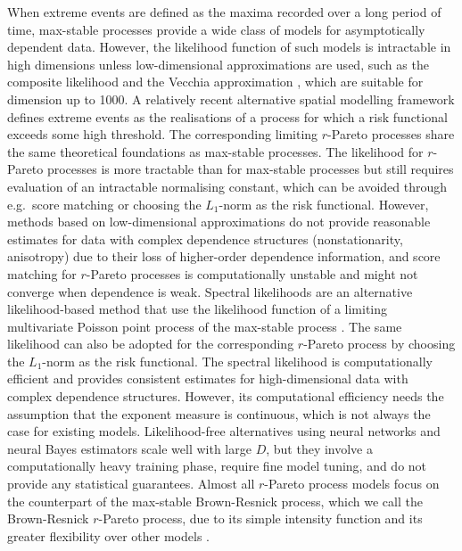 \documentclass[12pt]{article}
\begin{document}
When extreme events are defined as the maxima recorded over a long period of time, max-stable processes \citep{deHaan:1984, Schlather:2002} provide a wide class of models for asymptotically dependent data. However, the likelihood function of such models is intractable in high dimensions unless low-dimensional approximations are used, such as the composite likelihood \citep{Padoan.etal:2010,Davison.etal:2012, Whitaker.etal:2020} and the Vecchia approximation \citep{Huser.Zhong:2023}, which are suitable for dimension up to 1000. A relatively recent alternative spatial modelling framework defines extreme events as the realisations of a process for which a risk functional exceeds some high threshold. The corresponding limiting $r$-Pareto processes \citep{Ferreira.deHaan:2014, Dombry.Ribatet:2015, deFondeville.Davison:2018, deFondeville.Davison:2022} share the same theoretical foundations as max-stable processes. The likelihood for $r$-Pareto processes is more tractable than for max-stable processes but still requires evaluation of an intractable normalising constant, which can be avoided through e.g.~score matching \citep{deFondeville.Davison:2018,Lederer.Oesting:2023} or choosing the $L_1$-norm as the risk functional. However, methods based on low-dimensional approximations do not provide reasonable estimates for data with complex dependence structures (nonstationarity, anisotropy) due to their loss of higher-order dependence information, and score matching for $r$-Pareto processes is computationally unstable and might not converge when dependence is weak. 
Spectral likelihoods are an alternative likelihood-based method that use the likelihood function of a limiting multivariate Poisson point process of the max-stable process \citep{Coles.Tawn:1991,Engelke.etal:2015,Wadsworth.Tawn:2014}. The same likelihood can also be adopted for the corresponding $r$-Pareto process by choosing the $L_1$-norm as the risk functional. The spectral likelihood is computationally efficient and provides consistent estimates for high-dimensional data with complex dependence structures. However, its computational efficiency needs the assumption that the exponent measure is continuous, which is not always the case for existing models. Likelihood-free alternatives using neural networks \citep{Lenzi.etal:2023} and neural Bayes estimators \citep{Sainsbury.Zammit.Huser:2024, Richards.etal:2024} scale well with large $D$, but they involve a computationally heavy training phase, require fine model tuning, and do not provide any statistical guarantees. Almost all $r$-Pareto process models
focus on the counterpart of the max-stable Brown-Resnick process, which we call the Brown-Resnick $r$-Pareto process, 
due to its simple intensity function and its greater flexibility over other models \citep[see, e.g.,][]{deFondeville.Davison:2018, Richards.etal:2024, Hector.Reich:2024}.          
\end{document}
